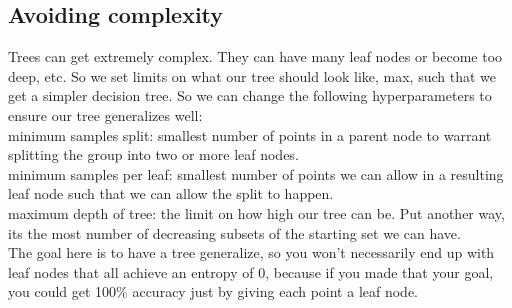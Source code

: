 \documentclass{article}
\begin{document}
\subsection{Avoiding complexity}
Trees can get extremely complex. They can have many leaf nodes or become too deep, etc. So we set limits on what our tree should look like, max, such that we get a simpler decision tree. So we can change the following hyperparameters to ensure our tree generalizes well:\\
minimum samples split: smallest number of points in a parent node to warrant splitting the group into two or more leaf nodes.\\
minimum samples per leaf: smallest number of points we can allow in a resulting leaf node such that we can allow the split to happen.\\
maximum depth of tree: the limit on how high our tree can be. Put another way, its the most number of decreasing subsets of the starting set we can have.\\

The goal here is to have a tree generalize, so you won't necessarily end up with leaf nodes that all achieve an entropy of 0, because if you made that your goal, you could get 100\% accuracy just by giving each point a leaf node.
 
\end{document}
